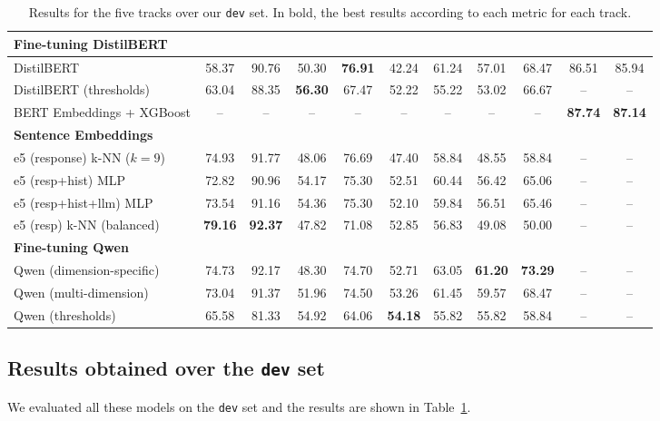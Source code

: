 \documentclass[11pt]{article}
\begin{document}
\begin{table}[ht!]
{\begin{tabular}{lcccccccccc}
\hline
\multicolumn{9}{l}{\textbf{Fine-tuning DistilBERT}} \\
\hline
DistilBERT & 58.37 & 90.76 & 50.30 & \textbf{76.91} & 42.24 & 61.24 & 57.01 & 68.47 & 86.51 & 85.94\\
DistilBERT  (thresholds) & 63.04 & 88.35 & \textbf{56.30} & 67.47 & 52.22 & 55.22 & 53.02 & 66.67 & -- & -- \\
BERT Embeddings + XGBoost & -- & -- & -- & -- & -- & -- & -- & -- & \textbf{87.74} & \textbf{87.14} \\ 
\hline
\multicolumn{9}{l}{\textbf{Sentence Embeddings}} \\
\hline

e5 (response) k-NN ($k=9$) & 74.93 & 91.77 & 48.06 & 76.69 & 47.40 & 58.84 & 48.55 & 58.84 & -- & -- \\
e5 (resp+hist) MLP & 72.82 & 90.96 & 54.17 & 75.30 & 52.51 & 60.44 & 56.42 & 65.06 & -- & -- \\
e5 (resp+hist+llm) MLP  & 73.54 & 91.16 & 54.36 & 75.30 & 52.10 & 59.84 & 56.51 & 65.46 & -- & -- \\
e5 (resp) k-NN (balanced) & \textbf{79.16} & \textbf{92.37} & 47.82 & 71.08 & 52.85 & 56.83 & 49.08 & 50.00 & -- & -- \\
\hline
\multicolumn{9}{l}{\textbf{Fine-tuning Qwen}} \\
\hline
Qwen (dimension-specific) & 74.73 & 92.17 & 48.30 & 74.70 & 52.71 & 63.05 & \textbf{61.20} & \textbf{73.29} & -- & -- \\
Qwen (multi-dimension) & 73.04 & 91.37 & 51.96 & 74.50 & 53.26 & 61.45 & 59.57 & 68.47 & -- & -- \\
Qwen (thresholds) & 65.58 & 81.33 & 54.92 & 64.06 & \textbf{54.18} & 55.82 & 55.82 & 58.84 & -- & -- \\
\hline
\end{tabular}
}
\caption{Results for the five tracks over our \texttt{dev} set. In bold, the best results according to each metric for each track.}
\label{tab:dev_results}
\end{table}

\subsection{Results obtained over the \texttt{dev} set}
\label{sec:results_dev}

We evaluated all these models on the \texttt{dev} set and the results are shown in Table~\ref{tab:dev_results}.
\end{document}
